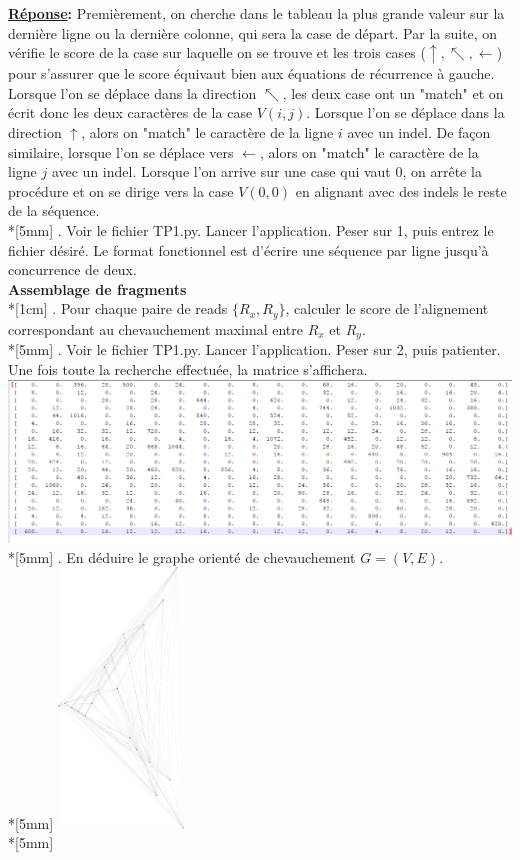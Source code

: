 \documentclass[11pt, letterpaper]{article}
\begin{document}
{\textbf{\underline{Réponse}:} Premièrement, on cherche dans le tableau la plus grande valeur sur la dernière ligne ou la dernière colonne, qui sera la case de départ. Par la suite, on vérifie le score de la case sur laquelle on se trouve et les trois cases ($\uparrow, \nwarrow, \leftarrow$) pour s'assurer que le score équivaut bien aux équations de récurrence à gauche. Lorsque l'on se déplace dans la direction $\nwarrow$, les deux case ont un "match" et on écrit donc les deux caractères de la case $V(i,j)$. Lorsque l'on se déplace dans la direction $\uparrow$, alors on "match" le caractère de la ligne $i$ avec un indel. De façon similaire, lorsque l'on se déplace vers $\leftarrow$, alors on "match" le caractère de la ligne $j$ avec un indel. Lorsque l'on arrive sur une case qui vaut 0, on arrête la procédure et on se dirige vers la case $V(0,0)$ en alignant avec des indels le reste de la séquence. \\*[5mm]
. Voir le fichier TP1.py. Lancer l'application. Peser sur 1, puis entrez le fichier désiré. Le format fonctionnel est d'écrire une séquence par ligne jusqu'à concurrence de deux.\\
\newpage
\textbf{Assemblage de fragments} \\*[1cm]
. Pour chaque paire de reads $\{R_x, R_y \}$, calculer le score de l'alignement correspondant au chevauchement maximal entre $R_x$ et $R_y$. \\*[5mm]
. Voir le fichier TP1.py. Lancer l'application. Peser sur 2, puis patienter. Une fois toute la recherche effectuée, la matrice s'affichera.
\includegraphics[width=\textwidth]{Images/Matrix_assemblage_no1.png} \\*[5mm]
. En déduire le graphe orienté de chevauchement $G = (V,E)$. \\*[5mm]
\centering
\includegraphics[width=0.25\textwidth]{Images/Assemblage_no2_initial.png}\\*[5mm]
}
\end{document}
